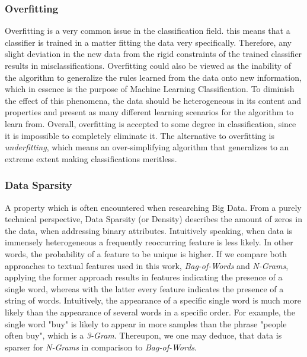 		\subsubsection{Overfitting}
			Overfitting is a very common issue in the classification field. this means that a classifier is trained in a matter fitting the data very specifically. Therefore, any slight deviation in the new data from the rigid constraints of the trained classifier results in misclassifications. Overfitting could also be viewed as the inability of the algorithm to generalize the rules learned from the data onto new information, which in essence is the purpose of Machine Learning Classification. To diminish the effect of this phenomena, the data should be heterogeneous in its content and properties and present as many different learning scenarios for the algorithm to learn from. Overall, overfitting is accepted to some degree in classification, since it is impossible to completely eliminate it. The alternative to overfitting is \textit{underfitting}, which means an over-simplifying algorithm that generalizes to an extreme extent making classifications meritless.
		
		\subsubsection{Data Sparsity}
			\label{data_sparsity}
			A property which is often encountered when researching Big Data. From a purely technical perspective, Data Sparsity (or Density) describes the amount of zeros in the data, when addressing binary attributes. Intuitively speaking, when data is immensely heterogeneous a frequently reoccurring feature is less likely. In other words, the probability of a feature to be unique is higher. If we compare both approaches to textual features used in this work, \textit{Bag-of-Words} and \textit{N-Grams}, applying the former approach results in features indicating the presence of a single word, whereas with the latter every feature indicates the presence of a string of words. Intuitively, the appearance of a specific single word is much more likely than the appearance of several words in a specific order. For example, the single word "buy" is likely to appear in more samples than the phrase "people often buy", which is a \textit{3-Gram}. Thereupon, we one may deduce, that data is sparser for \textit{N-Grams} in comparison to \textit{Bag-of-Words}.
		
